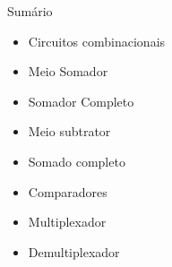 
\begin{frame}{Sumário}
    \begin{itemize}
        \item Circuitos combinacionais
        \item Meio Somador
        \item Somador Completo
        \item Meio subtrator
        \item Somado completo
        \item Comparadores
        \item Multiplexador
        \item Demultiplexador
    \end{itemize}
\end{frame}